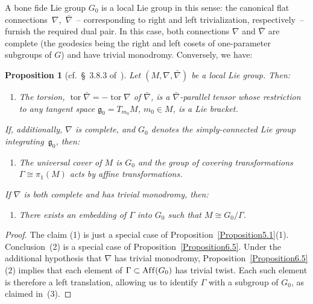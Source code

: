 \documentclass[pdftex]{sigma}
\DeclareMathOperator{\affine}{Af\/f}
\DeclareMathOperator{\torsion}{tor}
\numberwithin{equation}{section}
\newtheorem{PropositionBlaom}[TheoremBlaom]{Proposition}
 { \theoremstyle{definition}
\newtheorem{CounterexampleBlaom}[TheoremBlaom]{Counterexample}
\newtheorem{RemarkBlaom}[TheoremBlaom]{Remark} }
\begin{document}
A bone f\/ide Lie group $G_0$ is a local Lie group in this sense: the
canonical f\/lat connec\-tions~$\nabla $,~$\bar\nabla $~-- corresponding to right and left trivialization, respectively~--
furnish the required dual pair. In this case, both connections $\nabla
$ and $\bar\nabla $ are complete (the geodesics being the right and
left cosets of one-parameter subgroups of $G$) and have trivial
monodromy. Conversely, we have:

\begin{PropositionBlaom}[cf.~\S~3.8.3 of~\cite{Sharpe_97}]\label{Proposition7.1}
  Let $(M, \nabla, \bar\nabla)$ be a local Lie group. Then:
  \begin{enumerate}\itemsep=0pt
  \item[$(1)$]%
  The torsion, $\torsion\bar\nabla=-\torsion \nabla$ of
    $\bar\nabla $, is a $\bar\nabla$-parallel tensor whose restriction
    to any tangent space ${\mathfrak g}_0 = T_{m_0}M$, $m_0 \in M$, is
    a Lie bracket.
  \end{enumerate}

  If, additionally, $\nabla $ is complete, and $G_0$ denotes the
  simply-connected Lie group integrating~${\mathfrak g}_0$, then:
\begin{enumerate}\itemsep=0pt
  \item[$(2)$]%
  The universal cover of $M$ is $G_0$ and the group of covering
    transformations $\Gamma \cong \pi_1(M)$ acts by affine
    transformations.
  \end{enumerate}

  If $\nabla $ is both complete and has trivial monodromy, then:
\begin{enumerate}\itemsep=0pt
  \item[$(3)$] %
  There exists an embedding of $\Gamma $ into $G_0$ such that
    $M \cong G_0/\Gamma$.
  \end{enumerate}
\end{PropositionBlaom}
\begin{proof}
  The claim (1) is just a special case of Proposition~\ref{Proposition5.1}(1).
  Conclusion~(2) is a special case
  of Proposition~\ref{Proposition6.5}. %
  Under the additional
  hypothesis that $\nabla $ has trivial monodromy,
 Proposition~\ref{Proposition6.5}(2) %
 implies that each element of $\Gamma
  \subset \affine(G_0)$ has trivial twist. Each such element is
  therefore a left translation, allowing us to identify $\Gamma $ with
  a subgroup of $G_0$, as claimed in~(3).
\end{proof}
\end{document}
